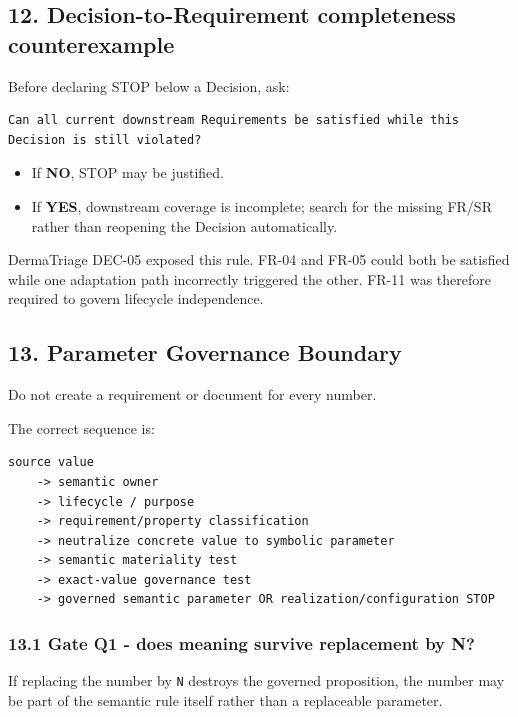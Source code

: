 \documentclass[11pt,a4paper]{article}
\providecommand{\tightlist}{\setlength{\itemsep}{0pt}\setlength{\parskip}{0pt}}
\begin{document}
\subsection{12. Decision-to-Requirement completeness
counterexample}\label{12-decision-to-requirement-completeness-counterexample}

Before declaring STOP below a Decision, ask:

\begin{verbatim}
Can all current downstream Requirements be satisfied while this Decision is still violated?
\end{verbatim}

\begin{itemize}
\tightlist
\item
  If \textbf{NO}, STOP may be justified.
\item
  If \textbf{YES}, downstream coverage is incomplete; search for the
  missing FR/SR rather than reopening the Decision automatically.
\end{itemize}

DermaTriage DEC-05 exposed this rule. FR-04 and FR-05 could both be
satisfied while one adaptation path incorrectly triggered the other.
FR-11 was therefore required to govern lifecycle independence.

\subsection{13. Parameter Governance
Boundary}\label{13-parameter-governance-boundary}

Do not create a requirement or document for every number.

The correct sequence is:

\begin{verbatim}
source value
    -> semantic owner
    -> lifecycle / purpose
    -> requirement/property classification
    -> neutralize concrete value to symbolic parameter
    -> semantic materiality test
    -> exact-value governance test
    -> governed semantic parameter OR realization/configuration STOP
\end{verbatim}

\subsubsection{13.1 Gate Q1 - does meaning survive replacement by
N?}\label{131-gate-q1---does-meaning-survive-replacement-by-n}

If replacing the number by \texttt{N} destroys the governed proposition,
the number may be part of the semantic rule itself rather than a
replaceable parameter.
\end{document}
